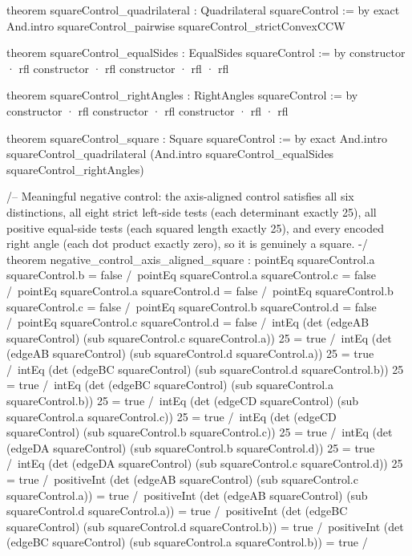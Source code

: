\documentclass[11pt]{article}
\begin{document}
\begin{Vlean}
theorem squareControl_quadrilateral : Quadrilateral squareControl := by
  exact And.intro squareControl_pairwise squareControl_strictConvexCCW

theorem squareControl_equalSides : EqualSides squareControl := by
  constructor
  · rfl
  constructor
  · rfl
  constructor
  · rfl
  · rfl

theorem squareControl_rightAngles : RightAngles squareControl := by
  constructor
  · rfl
  constructor
  · rfl
  constructor
  · rfl
  · rfl

theorem squareControl_square : Square squareControl := by
  exact And.intro squareControl_quadrilateral
    (And.intro squareControl_equalSides squareControl_rightAngles)

/-- Meaningful negative control: the axis-aligned control satisfies all six
distinctions, all eight strict left-side tests (each determinant exactly 25),
all positive equal-side tests (each squared length exactly 25), and every
encoded right angle (each dot product exactly zero), so it is genuinely a
square. -/
theorem negative_control_axis_aligned_square :
    pointEq squareControl.a squareControl.b = false /\
    pointEq squareControl.a squareControl.c = false /\
    pointEq squareControl.a squareControl.d = false /\
    pointEq squareControl.b squareControl.c = false /\
    pointEq squareControl.b squareControl.d = false /\
    pointEq squareControl.c squareControl.d = false /\
    intEq (det (edgeAB squareControl)
      (sub squareControl.c squareControl.a)) 25 = true /\
    intEq (det (edgeAB squareControl)
      (sub squareControl.d squareControl.a)) 25 = true /\
    intEq (det (edgeBC squareControl)
      (sub squareControl.d squareControl.b)) 25 = true /\
    intEq (det (edgeBC squareControl)
      (sub squareControl.a squareControl.b)) 25 = true /\
    intEq (det (edgeCD squareControl)
      (sub squareControl.a squareControl.c)) 25 = true /\
    intEq (det (edgeCD squareControl)
      (sub squareControl.b squareControl.c)) 25 = true /\
    intEq (det (edgeDA squareControl)
      (sub squareControl.b squareControl.d)) 25 = true /\
    intEq (det (edgeDA squareControl)
      (sub squareControl.c squareControl.d)) 25 = true /\
    positiveInt (det (edgeAB squareControl)
      (sub squareControl.c squareControl.a)) = true /\
    positiveInt (det (edgeAB squareControl)
      (sub squareControl.d squareControl.a)) = true /\
    positiveInt (det (edgeBC squareControl)
      (sub squareControl.d squareControl.b)) = true /\
    positiveInt (det (edgeBC squareControl)
      (sub squareControl.a squareControl.b)) = true /\

\end{Vlean}
\end{document}
